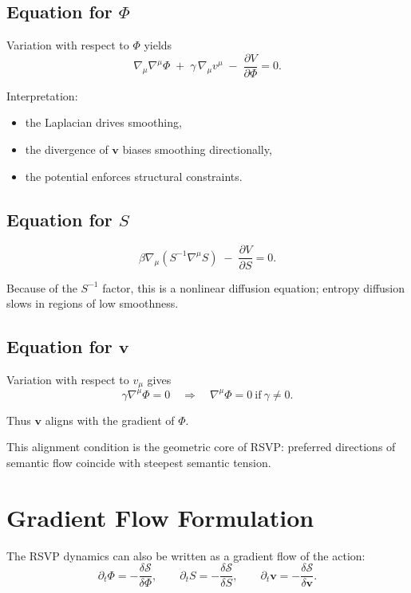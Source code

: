 \subsection{Equation for \texorpdfstring{$\Phi$}{Φ}}

Variation with respect to $\Phi$ yields
\[
\nabla_\mu\nabla^\mu \Phi
\;+\;
\gamma \, \nabla_\mu v^\mu
\;-\;
\frac{\partial V}{\partial \Phi}
=
0.
\]

Interpretation:
\begin{itemize}
\item the Laplacian drives smoothing,
\item the divergence of $\mathbf{v}$ biases smoothing directionally,
\item the potential enforces structural constraints.
\end{itemize}

\subsection{Equation for \texorpdfstring{$S$}{S}}

\[
\beta \nabla_\mu (S^{-1} \nabla^\mu S)
\;-\;
\frac{\partial V}{\partial S}
=
0.
\]

Because of the $S^{-1}$ factor, this is a nonlinear diffusion equation; entropy
diffusion slows in regions of low smoothness.

\subsection{Equation for \texorpdfstring{$\mathbf{v}$}{v}}

Variation with respect to $v_\mu$ gives
\[
\gamma \nabla^\mu \Phi = 0
\quad \Rightarrow \quad
\nabla^\mu \Phi = 0 \ \text{if}\ \gamma\neq 0.
\]

Thus $\mathbf{v}$ aligns with the gradient of $\Phi$.

This alignment condition is the geometric core of RSVP: preferred directions of
semantic flow coincide with steepest semantic tension.

\section{Gradient Flow Formulation}

The RSVP dynamics can also be written as a gradient flow of the action:
\[
\partial_t \Phi = - \frac{\delta \mathcal{S}}{\delta \Phi},
\qquad
\partial_t S = - \frac{\delta \mathcal{S}}{\delta S},
\qquad
\partial_t \mathbf{v} = - \frac{\delta \mathcal{S}}{\delta \mathbf{v}}.
\]

